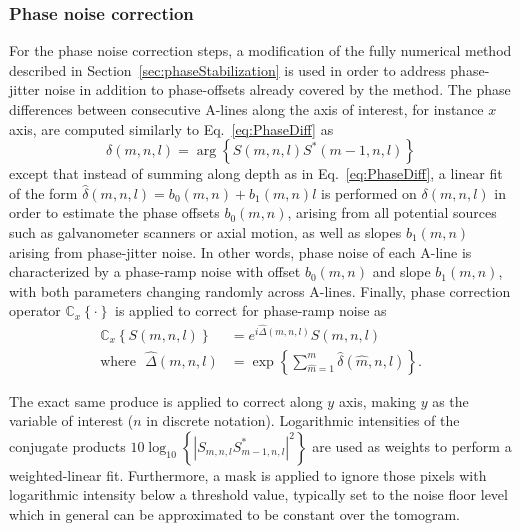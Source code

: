 \subsubsection{Phase noise correction}

For the phase noise correction steps, a modification of the fully numerical method described in Section~\ref{sec:phaseStabilization} is used in order to address phase-jitter noise in addition to phase-offsets already covered by the method. The phase differences between consecutive A-lines along the axis of interest, for instance $x$ axis, are computed similarly to Eq.~\eqref{eq:PhaseDiff} as
\begin{equation}
    \delta(m,n,l) = \arg\left\{S(m,n,l)S^*(m-1,n,l)\right\}
\end{equation}
except that instead of summing along depth as in Eq.~\eqref{eq:PhaseDiff}, a linear fit of the form $\hat{\delta}(m,n,l) = b_0(m,n) + b_1(m,n)l$ is performed on $\delta(m,n,l)$ in order to estimate the phase offsets $b_0(m,n)$, arising from all potential sources such as galvanometer scanners or axial motion, as well as slopes $b_1(m,n)$ arising from phase-jitter noise. In other words, phase noise of each A-line is characterized by a phase-ramp noise with offset $b_0(m,n)$ and slope $b_1(m,n)$, with both parameters changing randomly across A-lines. Finally, phase correction operator $\mathbb{C}_x\left\{\cdot\right\}$ is applied to correct for phase-ramp noise as
\begin{align}\label{eq:phaseDiffJitterCor}
   \mathbb{C}_x\left\{S(m,n,l)\right\} &= e^{i\hat{\Delta}(m,n,l)} S(m,n,l) \nonumber\\ \text{where} \ \ \ \hat{\Delta}(m,n,l) &= \exp\left\{\sum_{\hat{m} = 1}^m \hat{\delta}(\hat{m},n,l)\right\}.
\end{align}

The exact same produce is applied to correct along $y$ axis, making $y$ as the variable of interest ($n$ in discrete notation). Logarithmic intensities of the conjugate products $10\log_{10}\left\{|S_{m,n,l}S^*_{m-1,n,l}|^2\right\}$ are used as weights to perform a weighted-linear fit. Furthermore, a mask is applied to ignore those pixels with logarithmic intensity below a threshold value, typically set to the noise floor level which in general can be approximated to be constant over the tomogram.

